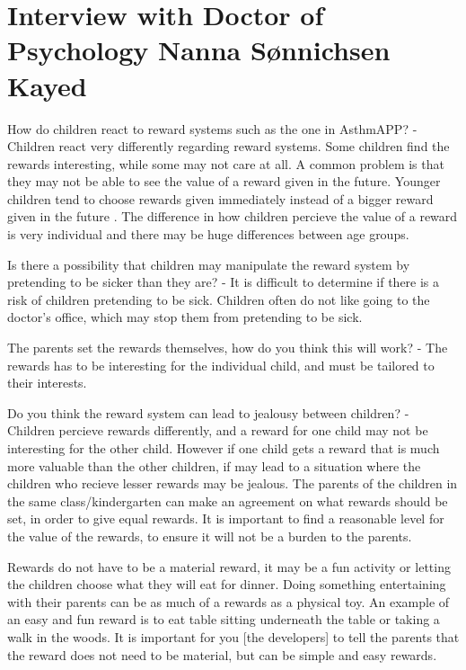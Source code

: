\section{Interview with Doctor of Psychology Nanna S\o nnichsen Kayed}
\label{sec:psychinterview}

How do children react to reward systems such as the one in AsthmAPP?
- Children react very differently regarding reward systems. Some children find the rewards interesting, while some may not care at all. A common problem is that they may not be able to see the value of a reward given in the future. Younger children tend to choose rewards given immediately instead of a bigger reward given in the future \cite{mischel1972cognitive}.
The difference in how children percieve the value of a reward is very individual and there may be huge differences between age groups. 


Is there a possibility that children may manipulate the reward system by pretending to be sicker than they are?
- It is difficult to determine if there is a risk of children pretending to be sick. Children often do not like going to the doctor's office, which may stop them from pretending to be sick.


The parents set the rewards themselves, how do you think this will work?
- The rewards has to be interesting for the individual child, and must be tailored to their interests. 

Do you think the reward system can lead to jealousy between children?
- Children percieve rewards differently, and a reward for one child may not be interesting for the other child. However if one child gets a reward that is much more valuable than the other children, if may lead to a situation where the children who recieve lesser rewards may be jealous. The parents of the children in the same class/kindergarten can make an agreement on what rewards should be set, in order to give equal rewards. It is important to find a reasonable level for the value of the rewards, to ensure it will not be a burden to the parents.


Rewards do not have to be a material reward, it may be a fun activity or letting the children choose what they will eat for dinner. Doing something entertaining with their parents can be as much of a rewards as a physical toy. An example of an easy and fun reward is to eat table sitting underneath the table or taking a walk in the woods. It is important for you [the developers] to tell the parents that the reward does not need to be material, but can be simple and easy rewards.


